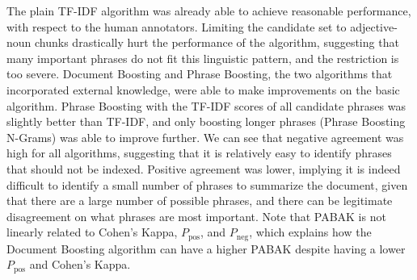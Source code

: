 The plain TF-IDF algorithm was already able to achieve reasonable
performance, with respect to the human annotators. Limiting the
candidate set to adjective-noun chunks drastically hurt the
performance of the algorithm, suggesting that many important phrases
do not fit this linguistic pattern, and the restriction is too
severe. Document Boosting and Phrase Boosting, the two algorithms that
incorporated external knowledge, were able to make improvements on the
basic algorithm. Phrase Boosting with the TF-IDF scores of all
candidate phrases was slightly better than TF-IDF, and only boosting
longer phrases (Phrase Boosting N-Grams) was able to improve
further. We can see that negative agreement was high for all
algorithms, suggesting that it is relatively easy to identify phrases
that should not be indexed. Positive agreement was lower, implying it is indeed difficult to identify a small number of phrases to summarize the document, given that there are a large number of possible phrases, and there can be legitimate disagreement on what phrases are most important. Note that PABAK is not linearly related to Cohen's Kappa, $P_{\text{pos}}$, and $P_{\text{neg}}$, which explains how the Document Boosting algorithm can have a higher PABAK despite having a lower $P_{\text{pos}}$ and Cohen's Kappa.
